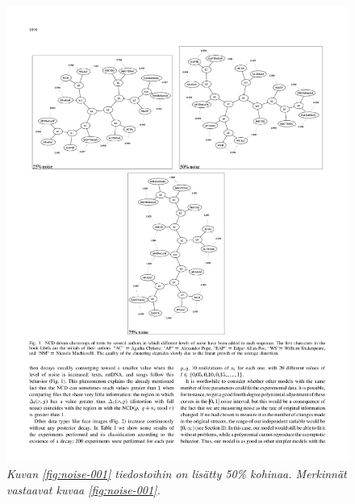 \documentclass[12pt,finnish]{tktltiki2}
\theoremstyle{definition}
\theoremstyle{remark}
\begin{document}
    \begin{figure}[tb]
      \immediate{}
      \includegraphics{img/noise-002}
      \caption{\emph{Kuvan \ref{fig:noise-001} tiedostoihin on lisätty 50\% kohinaa. Merkinnät vastaavat kuvaa \ref{fig:noise-001}.}
      \cite{4167725}}
      \label{fig:noise-002}
    \end{figure}
\end{document}
